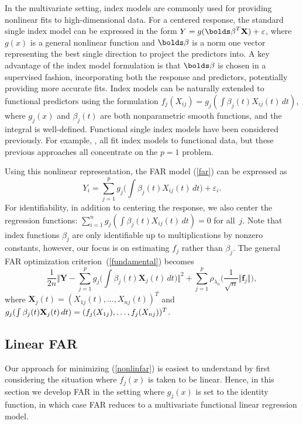 \documentclass[aos,MSNbibl,dvips]{arximspdf}
\newcommand{\rrVert}{\Vert}
\newcommand{\llVert}{\Vert}
\newcommand{\bbeta}{{\bolds\beta}}
\newcommand{\bY}{{\mathbf Y}}
\newcommand{\bX}{{\mathbf X}}
\newcommand{\bff}{{\mathbf f}}
\begin{document}
In the multivariate setting, index models are commonly used for
providing nonlinear fits to high-dimensional data. For a centered
response, the standard single index model can be expressed in the form
$Y=g(\bbeta^T\bX) + \varepsilon$,
where $g(x)$ is a general
nonlinear function and $\bbeta$ is a norm one vector representing the
best single direction to project the predictors into. A key advantage of
the index model formulation is that $\bbeta$ is chosen in a supervised
fashion, incorporating both the response and predictors, potentially
providing more accurate fits. Index models can be naturally extended to
functional predictors using the formulation $f_j(X_{ij}) = g_j
(\int\beta_j(t)X_{ij}(t)\,dt )$, where $g_j(x)$ and $\beta_j(t)$
are both nonparametric smooth functions, and the integral is
well-defined. %
Functional single index models have been considered previously. For
example, \cite{james5,amato1,ait1,chen2,ferraty4}, all fit index models to functional data, but these
previous approaches all concentrate on the $p=1$ problem.

Using this nonlinear representation, the FAR model (\ref{far}) can be
expressed as
%
\begin{equation}
\label{simfar} Y_i = \sum_{j=1}^p
g_j \biggl(\int\beta_j(t)X_{ij}(t)\,dt \biggr)
+ \varepsilon_i.
\end{equation}
%
For identifiability, in addition to centering the response, we also
center the regression functions: $\sum_{i=1}^n g_j (\int\beta
_j(t)X_{ij}(t)\,dt )=0$ for all~$j$. Note that index functions
$\beta_j$ are only identifiable up to multiplications by nonzero
constants, however, our focus is on estimating $f_j$ rather than $\beta
_j$. The general FAR optimization criterion~(\ref{fundamental}) becomes
%
\begin{equation}
\label{nonlinfar} \frac{1}{2n} \Biggl\llVert\bY-\sum
_{j=1}^p g_j \biggl(\int
\beta_j(t) \bX_j(t)\,dt \biggr)\Biggr\rrVert
^2 + \sum_{j=1}^p
\rho_{\lambda_n} \biggl(\frac{1}{\sqrt n}\llVert\bff_j\rrVert
\biggr),
\end{equation}
%
where\vspace*{1pt} $\bX_j(t) = (X_{1j}(t), \ldots, X_{nj}(t))^T$ and $g_j
(\int\beta_j(t) \bX_j(t)\,dt ) = (f_j(X_{1j}), \ldots,\break  f_j(X_{nj}))^T$.

\subsection{Linear FAR}
\label{linearfarsec}
Our approach for minimizing (\ref{nonlinfar}) is easiest to understand
by first considering the situation where $f_j(x)$ is taken to be
linear. Hence, in this section we develop FAR in the setting where
$g_j(x)$ is set to the identity function, in which case FAR reduces to
a multivariate functional linear regression model.
\end{document}
